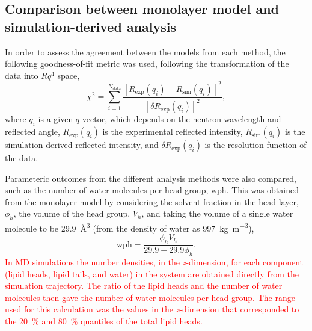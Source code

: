 \documentclass[amsmath,amssymb,twocolumn,superscriptaddress]{revtex4-1}
\begin{document}
\subsection{Comparison between monolayer model and simulation-derived analysis}
\label{sec:para}
In order to assess the agreement between the models from each method, the
following goodness-of-fit metric was used, following the transformation of
the data into $Rq^4$ space,
%
\begin{equation}
  \chi^2 = \sum_{i=1}^{N_{\text{data}}} \frac{[R_{\text{exp}}(q_i) -
  R_{\text{sim}}(q_i)]^2}{[\delta R_{\text{exp}}(q_i)]^2},
\end{equation}
%
where $q_i$ is a given $q$-vector, which depends on the neutron wavelength
and reflected angle, $R_{\text{exp}}(q_i)$ is the experimental reflected
intensity, $R_{\text{sim}}(q_i)$ is the simulation-derived reflected
intensity, and $\delta R_{\text{exp}}(q_i)$ is the resolution function of
the data.

Parameteric outcomes from the different analysis methods were also compared,
such as the number of water molecules per head group, wph.
This was obtained from the monolayer model by considering the solvent
fraction in the head-layer, $\phi_h$, the volume of the head group, $V_h$,
and taking the volume of a single water molecule to be
\SI{29.9}{\cubic\angstrom} (from the density of water as
\SI{997}{\kilo\gram\per\cubic\meter}),
%
\begin{equation}
  \text{wph} = \frac{\phi_hV_h}{29.9 - 29.9\phi_h}.
  \label{equ:wph}
\end{equation}
%
\textcolor{red}{In MD simulations the number densities, in the \emph{z}-dimension, for each
component (lipid heads, lipid tails, and water) in the system are obtained
directly from the simulation trajectory.
The ratio of the lipid heads and the number of water molecules then gave the
number of water molecules per head group.
The range used for this calculation was the values in the \emph{z}-dimension
that corresponded to the \SI{20}{\percent} and \SI{80}{\percent} quantiles
of the total lipid heads.}
\end{document}
